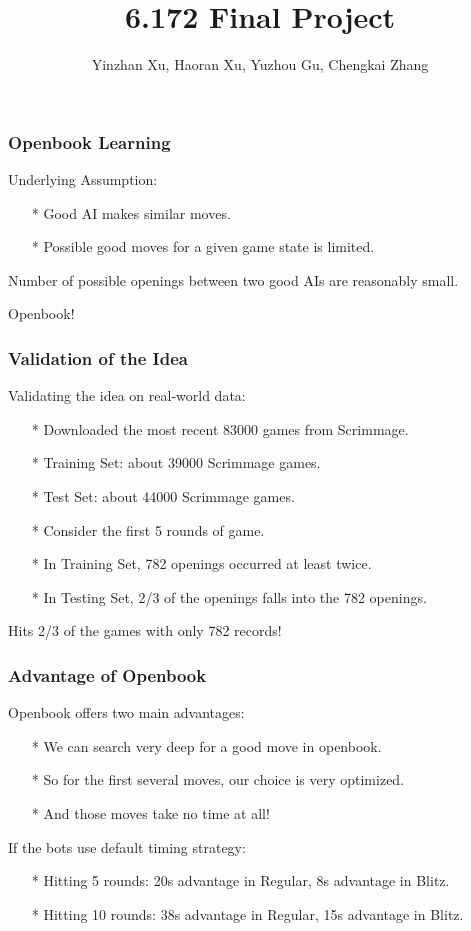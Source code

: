 \documentclass[10pt]{beamer}
\begin{document}
	\title{6.172 Final Project}
	\author{Yinzhan Xu, Haoran Xu, Yuzhou Gu, Chengkai Zhang}
	\date{}

	\begin{frame}
		\titlepage
	\end{frame}
	
	\begin{frame}
		\frametitle{Openbook Learning}
		Underlying Assumption:\pause 
		\begin{itemize}
		\item[*] Good AI makes similar moves.\pause
		\item[*] Possible good moves for a given game state is limited.\pause
		\end{itemize}
		Number of possible openings between two good AIs are reasonably small.\pause
		
		Openbook!
	\end{frame}
	
	\begin{frame}
		\frametitle{Validation of the Idea}
		Validating the idea on real-world data:\pause
		\begin{itemize}
		\item[*] Downloaded the most recent 83000 games from Scrimmage.
		\item[*] Training Set: about 39000 Scrimmage games.\pause
		\item[*] Test Set: about 44000 Scrimmage games.\pause
		\item[*] Consider the first \textcolor{dred}{5} rounds of game.\pause
		\item[*] In Training Set, \textcolor{fgreen}{782} openings occurred at least \textcolor{fgreen}{twice}.\pause
		\item[*] In Testing Set, \textcolor{fgreen}{2/3} of the openings falls into the 782 openings.\pause
		\end{itemize}
		Hits \textcolor{fgreen}{2/3} of the games with only \textcolor{fgreen}{782} records!
	\end{frame}
	
	\begin{frame}
		\frametitle{Advantage of Openbook}
		Openbook offers two main advantages:\pause
		\begin{itemize}
		\item[*] We can search very deep for a good move in openbook.\pause
		\item[*] So for the first several moves, our choice is very optimized.\pause
		\item[*] And those moves take no time at all!\pause
		\end{itemize}
		If the bots use default timing strategy:\pause
		\begin{itemize}
		\item[*] Hitting \textcolor{fgreen}{5} rounds: \textcolor{fgreen}{20s} advantage in Regular, \textcolor{fgreen}{8s} advantage in Blitz.
		\item[*] Hitting \textcolor{fgreen}{10} rounds: \textcolor{fgreen}{38s} advantage in Regular, \textcolor{fgreen}{15s} advantage in Blitz.
		\end{itemize}
	\end{frame}
	
\end{document}
